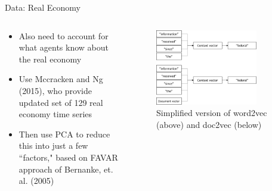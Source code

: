 \documentclass[9pt]{beamer}
\begin{document}
	\begin{frame}{Data: Real Economy}
	
	\begin{columns}
		\begin{column}{0.5\textwidth}
			\begin{itemize}
				\item Also need to account for what agents know about the real economy
				\item Use Mccracken and Ng (2015), who provide updated set of 129 real economy time series
				\item Then use PCA to reduce this into just a few ``factors," based on FAVAR approach of Bernanke, et. al. (2005)
			\end{itemize}
		\end{column}
		\begin{column}{0.5\textwidth}
			\begin{figure}
				\includegraphics[width=0.8\textwidth]{doc2vec.png}
				\caption{Simplified version of word2vec (above) and doc2vec (below)}
			\end{figure}
		\end{column}
	\end{columns}
	
	
	\end{frame}
\end{document}
